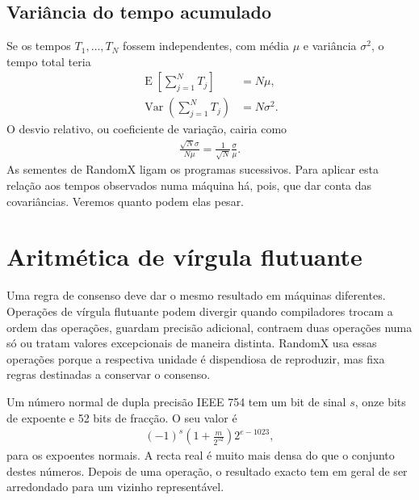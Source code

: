 \subsection{Variância do tempo acumulado}

Se os tempos \(T_1,\ldots,T_N\) fossem independentes, com média \(\mu\) e
variância \(\sigma^2\), o tempo total teria
\begin{align*}
 \operatorname E\!\left[\sum_{j=1}^NT_j\right]&=N\mu,\\
 \operatorname{Var}\!\left(\sum_{j=1}^NT_j\right)&=N\sigma^2.
\end{align*}
O desvio relativo, ou coeficiente de variação, cairia como
\begin{align}
 \frac{\sqrt N\sigma}{N\mu}
 =\frac{1}{\sqrt N}\frac{\sigma}{\mu}.
 \label{eq:randomx-chain-variance}
\end{align}
As sementes de RandomX ligam os programas sucessivos. Para aplicar esta
relação aos tempos observados numa máquina há, pois, que dar conta das
covariâncias. Veremos quanto podem elas pesar.



\section{Aritmética de vírgula flutuante}
\label{sec:randomx-floating-point}

Uma regra de consenso deve dar o mesmo resultado em máquinas diferentes.
Operações de vírgula flutuante podem divergir quando compiladores trocam a
ordem das operações, guardam precisão adicional, contraem duas operações numa
só ou tratam valores excepcionais de maneira distinta. RandomX usa essas
operações porque a respectiva unidade é dispendiosa de reproduzir, mas fixa
regras destinadas a conservar o consenso.

Um número normal de dupla precisão IEEE 754 tem um bit de sinal \(s\), onze
bits de expoente e 52 bits de fracção. O seu valor é
\begin{align}
 (-1)^s\left(1+\frac{m}{2^{52}}\right)2^{e-1023},
 \label{eq:randomx-binary64}
\end{align}
para os expoentes normais. A recta real é muito mais densa do que o conjunto
destes números. Depois de uma operação, o resultado exacto tem em geral de ser
arredondado para um vizinho representável.

